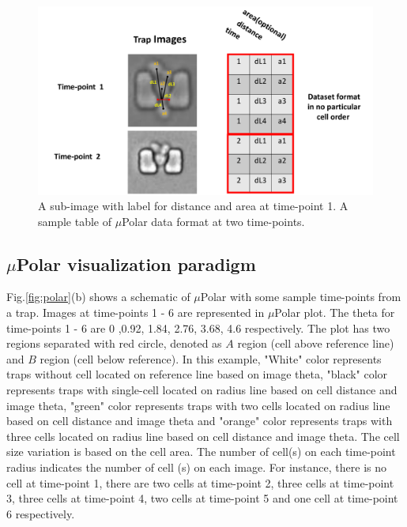 \documentclass[conference]{IEEEtran}
\begin{document}
\begin{figure}
\centering
\includegraphics[width=\textwidth,height=10 cm]{Patterns/table.pdf}
\caption{ A sub-image with label for distance and area at time-point 1. A sample table of $\mu$Polar data format at two time-points.}
\label{fig:table}
\end{figure}


\subsection{$\mu$Polar visualization paradigm}
Fig.\ref{fig:polar}(b) shows a schematic of $\mu$Polar with some sample time-points from a trap. Images at time-points 1 - 6 are represented in $\mu$Polar plot. The theta for time-points 1 - 6 are 0 ,0.92, 1.84, 2.76, 3.68, 4.6 respectively. The plot has two regions separated with red circle, denoted as $ A $ region (cell above reference line) and $ B $ region (cell below reference). In this example, "White" color represents traps without cell located on reference line based on image theta, "black" color represents traps with single-cell located on radius line based on cell distance and image theta, "green" color represents traps with two cells located on radius line based on cell distance and image theta and "orange" color represents traps with three cells located on radius line based on cell distance and image theta. The cell size variation is based on the cell area. The number of cell(s) on each time-point radius indicates the number of cell (s) on each image. For instance, there is no cell at time-point 1, there are two cells at time-point 2, three cells at time-point 3, three cells at time-point 4, two cells at time-point 5 and one cell at time-point 6 respectively.
\end{document}
